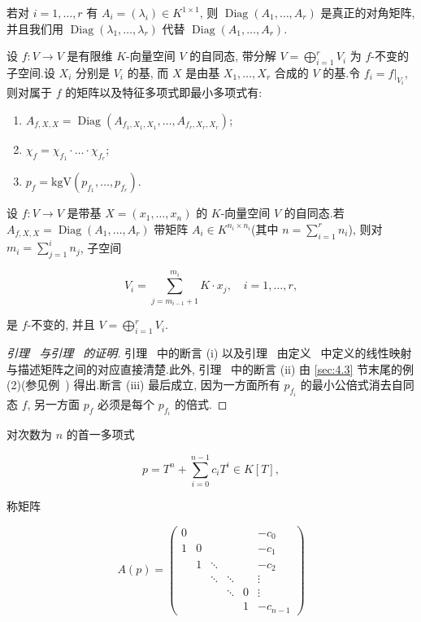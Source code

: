 若对 $i = 1, \ldots, r$ 有 $A_i = (\lambda_i) \in K^{1 \times 1}$, 则 $\operatorname{Diag}(A_1, \ldots, A_r)$ 是真正的对角矩阵, 并且我们用 $\operatorname{Diag}(\lambda_1, \ldots, \lambda_r)$ 代替 $\operatorname{Diag}(A_1, \ldots, A_r)$.

\begin{lemma}\label{lem:6.5.8}
设 $f \colon V \longrightarrow V$ 是有限维 $K$-向量空间 $V$ 的自同态, 带分解 $V = \bigoplus_{i = 1}^{r} V_i$ 为 $f$-不变的子空间.设 $X_i$ 分别是 $V_i$ 的基, 而 $X$ 是由基 $X_1, \ldots, X_r$ 合成的 $V$ 的基.令 $f_i = f|_{V_i}$, 则对属于 $f$ 的矩阵以及特征多项式即最小多项式有:
\begin{enumerate}
\item[(i)] $A_{f, X, X} = \operatorname{Diag}(A_{f_1, X_1, X_1}, \ldots, A_{f_r, X_r, X_r})$;
\item[(ii)] $\chi_f = \chi_{f_1} \cdot \ldots \cdot \chi_{f_r}$;
\item[(iii)] $p_f = \mathrm{kgV}(p_{f_1}, \ldots, p_{f_r})$.
\end{enumerate}
\end{lemma}

\begin{lemma}\label{lem:6.5.9}
设 $f \colon V \longrightarrow V$ 是带基 $X = (x_1, \ldots, x_n)$ 的 $K$-向量空间 $V$ 的自同态.若 $A_{f, X, X} = \operatorname{Diag}(A_1, \ldots, A_r)$ 带矩阵 $A_i \in K^{n_i \times n_i}$(其中 $n = \sum_{i = 1}^{r} n_i$), 则对 $m_i = \sum_{j = 1}^{i} n_j$, 子空间

\[
V_i = \sum_{j = m_{i - 1} + 1}^{m_i} K \cdot x_j, \quad i = 1, \ldots, r,\]

是 $f$-不变的, 并且 $V = \bigoplus_{i = 1}^{r} V_i$.
\end{lemma}

\begin{proof}[引理~ 与引理~ 的证明]
引理~ 中的断言 (i) 以及引理~ 由定义~ 中定义的线性映射与描述矩阵之间的对应直接清楚.此外, 引理~ 中的断言 (ii) 由 \ref{sec:4.3} 节末尾的例 (2)(参见例~) 得出.断言 (iii) 最后成立, 因为一方面所有 $p_{f_i}$ 的最小公倍式消去自同态 $f$, 另一方面 $p_f$ 必须是每个 $p_{f_i}$ 的倍式.
\end{proof}

对次数为 $n$ 的首一多项式

\[
p = T^n + \sum_{i = 0}^{n - 1} c_i T^i \in K[T],\]

称矩阵

\[
A(p) = \left(\begin{array}{cccccc}
0 & & & & & -c_0 \\
1 & 0 & & & & -c_1 \\
 & 1 & \ddots & & & -c_2 \\
 & & \ddots & \ddots & & \vdots \\
 & & & \ddots & 0 & \vdots \\
 & & & & 1 & -c_{n-1}
\end{array}\right)\]

